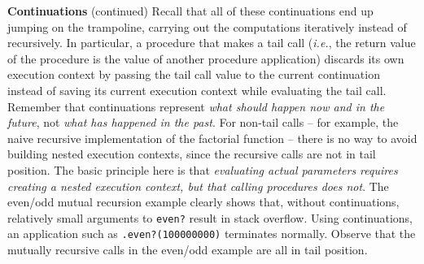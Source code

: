 \begin{minipage}[t]{\sw}
\slidenumber
\LARGE
{\bf Continuations} (continued)\exx
Recall that all of these continuations end up
jumping on the trampoline,
carrying out the computations
iteratively instead of recursively.
In particular,
a procedure that makes a tail call
({\em i.e.}, the return value of the procedure
is the value of another procedure application)
discards its own execution context
by passing the tail call value
to the current continuation
instead of saving its current execution context
while evaluating the tail call.
Remember that continuations represent
{\em what should happen now and in the future},
not {\em what has happened in the past}.\exx
For non-tail calls --
for example, the naive recursive implementation
of the factorial function --
there is no way to avoid building nested execution contexts,
since the recursive calls are not in tail position.
The basic principle here is that
{\em evaluating actual parameters
requires creating a nested execution context,
but that calling procedures does not}.\exx
The even/odd mutual recursion example clearly shows that,
without continuations,
relatively small arguments to \verb'even?' result
in stack overflow.
Using continuations,
an application such as \verb'.even?(100000000)'
terminates normally.
Observe that the mutually recursive calls
in the even/odd example are all in tail position.
\end{minipage}
